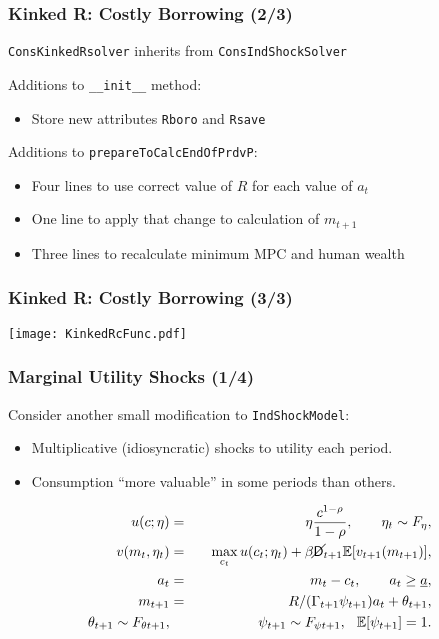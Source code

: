 \documentclass[11ptt]{beamer}
\newcommand{\E}{\mathbb{E}}
\newcommand{\bi}{\begin{itemize}}
\newcommand{\ei}{\end{itemize}}
\newcommand{\Die}{\mathsf{D}}
\newcommand{\Live}{\cancel{\Die}}
\begin{document}
\begin{frame}
\frametitle{Kinked R: Costly Borrowing (2/3)}
\texttt{ConsKinkedRsolver} inherits from \texttt{ConsIndShockSolver}

\begin{block}{Additions to \texttt{\_\_init\_\_} method:}
\begin{itemize}
\item Store new attributes \texttt{Rboro} and \texttt{Rsave}
\end{itemize}
\end{block}
\begin{block}{Additions to \texttt{prepareToCalcEndOfPrdvP}:}
\begin{itemize}
\item Four lines to use correct value of $R$ for each value of $a_t$

\item One line to apply that change to calculation of $m_{t+1}$

\item Three lines to recalculate minimum MPC and human wealth
\end{itemize}
\end{block}
\end{frame}


\begin{frame}
\frametitle{Kinked R: Costly Borrowing (3/3)}
\begin{center}
\texttt{[image: KinkedRcFunc.pdf]}
\end{center}
\end{frame}


\begin{frame}
\frametitle{Marginal Utility Shocks (1/4)}
Consider another small modification to \texttt{IndShockModel}:
\bi
\item Multiplicative (idiosyncratic) shocks to utility each period.

\item Consumption ``more valuable'' in some periods than others.
\ei
\begin{eqnarray*}
u(c;\eta) &=& \eta \frac{c^{1-\rho}}{1-\rho}, \qquad \eta_t \sim F_{\eta}, \\
v(m_t,\eta_t) &=& \max_{c_t} u(c_t;\eta_t) + \beta \Live_{t+1} \E [v_{t+1}(m_{t+1}) ], \\
a_t &=& m_t - c_t, \qquad a_t \geq \underline{a}, \\
m_{t+1} &=& R/(\Gamma_{t+1} \psi_{t+1}) a_t + \theta_{t+1}, \\
\theta_{t+1} \sim F_{\theta t+1}, &\qquad& \psi_{t+1} \sim F_{\psi t+1}, \hspace{0.25cm} \E[\psi_{t+1}] = 1.
\end{eqnarray*}
\end{frame}
\end{document}
